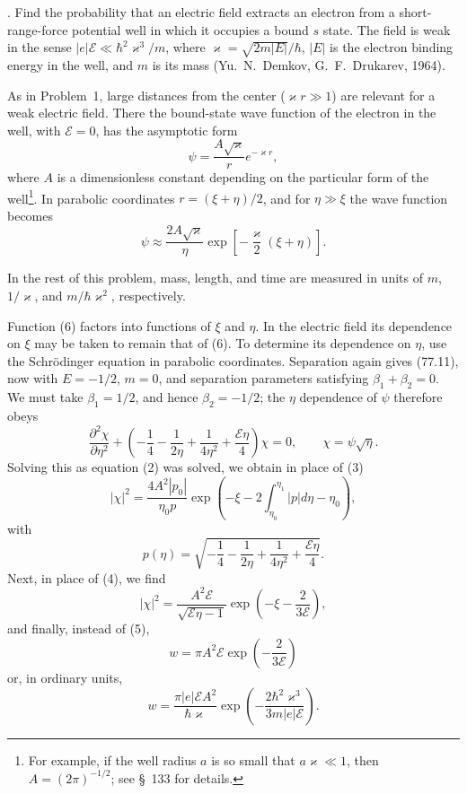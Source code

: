 . Find the probability that an electric field extracts an electron from a short-range-force potential well in which it occupies a bound $s$ state. The field is weak in the sense $|e|\mathcal E\ll\hbar^2\varkappa^3/m$, where $\varkappa=\sqrt{2m|E|}/\hbar$, $|E|$ is the electron binding energy in the well, and $m$ is its mass (Yu.~N.~Demkov, G.~F.~Drukarev, 1964).

\SolutionHeading As in Problem~1, large distances from the center ($\varkappa r\gg1$) are relevant for a weak electric field. There the bound-state wave function of the electron in the well, with $\mathcal E=0$, has the asymptotic form
\[
 \psi=\frac{A\sqrt\varkappa}{r}e^{-\varkappa r},
\]
where $A$ is a dimensionless constant depending on the particular form of the well\footnote{For example, if the well radius $a$ is so small that $a\varkappa\ll1$, then $A=(2\pi)^{-1/2}$; see \S~133 for details.}. In parabolic coordinates $r=(\xi+\eta)/2$, and for $\eta\gg\xi$ the wave function becomes
\begin{equation}
 \psi\approx\frac{2A\sqrt\varkappa}{\eta}\exp\left[-\frac\varkappa2(\xi+\eta)\right].
 \tag{6}
\end{equation}

In the rest of this problem, mass, length, and time are measured in units of $m$, $1/\varkappa$, and $m/\hbar\varkappa^2$, respectively.

Function (6) factors into functions of $\xi$ and $\eta$. In the electric field its dependence on $\xi$ may be taken to remain that of (6). To determine its dependence on $\eta$, use the Schrödinger equation in parabolic coordinates. Separation again gives (77.11), now with $E=-1/2$, $m=0$, and separation parameters satisfying $\beta_1+\beta_2=0$. We must take $\beta_1=1/2$, and hence $\beta_2=-1/2$; the $\eta$ dependence of $\psi$ therefore obeys
\[
 \frac{\partial^2\chi}{\partial\eta^2}+\left(-\frac14-\frac1{2\eta}+\frac1{4\eta^2}+\frac{\mathcal E\eta}{4}\right)\chi=0,\qquad \chi=\psi\sqrt\eta.
\]
Solving this as equation (2) was solved, we obtain in place of (3)
\[
 |\chi|^2=\frac{4A^2|p_0|}{\eta_0p}\exp\left(-\xi-2\int_{\eta_0}^{\eta_1}|p|d\eta-\eta_0\right),
\]
with
\[
 p(\eta)=\sqrt{-\frac14-\frac1{2\eta}+\frac1{4\eta^2}+\frac{\mathcal E\eta}{4}}.
\]
Next, in place of (4), we find
\[
 |\chi|^2=\frac{A^2\mathcal E}{\sqrt{\mathcal E\eta-1}}\exp\left(-\xi-\frac2{3\mathcal E}\right),
\]
and finally, instead of (5),
\[
 w=\pi A^2\mathcal E\exp\left(-\frac2{3\mathcal E}\right)
\]
or, in ordinary units,
\[
 w=\frac{\pi|e|\mathcal EA^2}{\hbar\varkappa}\exp\left(-\frac{2\hbar^2\varkappa^3}{3m|e|\mathcal E}\right).
\]

